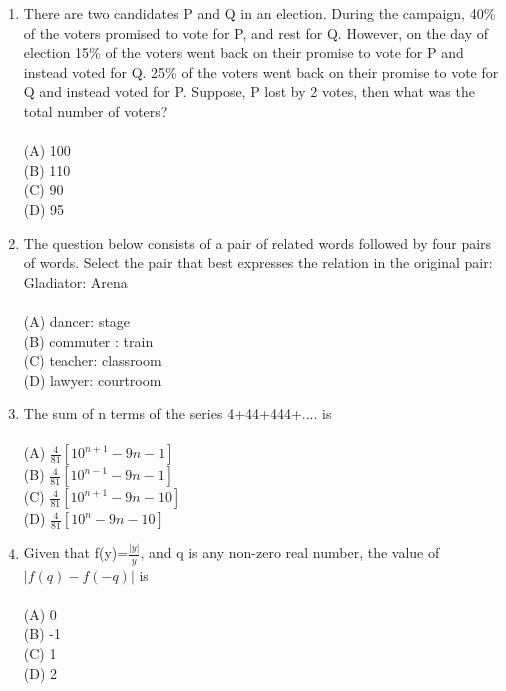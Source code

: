 \documentclass[journal,12pt,onecolumn]{IEEEtran}
\begin{document}
\begin{enumerate}[label=\textbf{Q\arabic*.},itemsep=2em]
\item There are two candidates P and Q in an election. During the campaign, 40\% of the voters promised to vote for P, and rest for Q. However, on the day of election 15\% of the voters went back on their promise to vote for P and instead voted for Q. 25\% of the voters went back on their promise to vote for Q and instead voted for P. Suppose, P lost by 2 votes, then what was the total number of voters?\\
\vspace{0.2cm}
\hfill{} \\
(A) 100 \\
(B) 110 \\
(C) 90 \\
(D) 95

\newpage
\item The question below consists of a pair of related words followed by four pairs of words. Select the pair that best expresses the relation in the original pair: \\
Gladiator: Arena \\
\vspace{0.2cm}
\hfill{} \\
(A) dancer: stage \\
(B) commuter : train \\
(C) teacher: classroom \\
(D) lawyer: courtroom

\item The sum of n terms of the series 4+44+444+.... is \\
\vspace{0.2cm}
\hfill{} \\
(A) $\frac{4}{81} [10^{n+1} - 9n - 1]$ \\
\vspace{0.1cm}
(B) $\frac{4}{81} [10^{n-1} - 9n - 1]$ \\
\vspace{0.1cm}
(C) $\frac{4}{81} [10^{n+1} - 9n - 10]$ \\
\vspace{0.1cm}
(D) $\frac{4}{81} [10^{n} - 9n - 10]$

\item Given that f(y)=$\frac{|y|}{y}$, and q is any non-zero real number, the value of $|f(q) - f(-q)|$ is \\
\vspace{0.2cm}
\hfill{} \\
(A) 0 \\
(B) -1 \\
(C) 1 \\
(D) 2


\end{enumerate}
\end{document}
